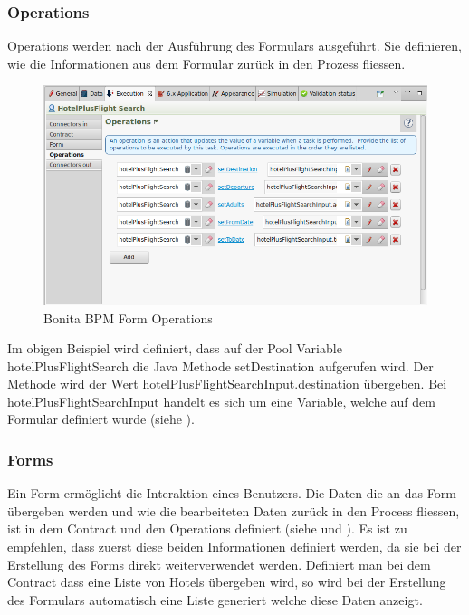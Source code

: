 \subsubsection{Operations}
\label{sec:analyse:bonita:forms:operations}
Operations werden nach der Ausführung des Formulars ausgeführt. Sie definieren, wie die Informationen aus dem Formular zurück in den Prozess fliessen.

\begin{figure}[H]
	\centering
	\includegraphics[width=1\textwidth]{images/bonita-operations.png}
	\caption{Bonita BPM Form Operations}
	\label{fig:analyse:bonita:forms:operations}
\end{figure}
Im obigen Beispiel wird definiert, dass auf der Pool Variable hotelPlusFlightSearch die Java Methode setDestination aufgerufen wird. Der Methode wird der Wert hotelPlusFlightSearchInput.destination übergeben. Bei hotelPlusFlightSearchInput handelt es sich um eine Variable, welche auf dem Formular definiert wurde (siehe ).

\subsubsection{Forms}
\label{sec:analyse:bonita:forms:forms}
Ein Form ermöglicht die Interaktion eines Benutzers. Die Daten die an das Form übergeben werden und wie die bearbeiteten Daten zurück in den Process fliessen, ist in dem Contract und den Operations definiert (siehe  und  ). Es ist zu empfehlen, dass zuerst diese beiden Informationen definiert werden, da sie bei der Erstellung des Forms direkt weiterverwendet werden. Definiert man bei dem Contract dass eine Liste von Hotels übergeben wird, so wird bei der Erstellung des Formulars automatisch eine Liste generiert welche diese Daten anzeigt. 

